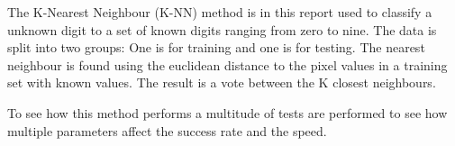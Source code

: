 

The K-Nearest Neighbour (K-NN) method is in this report used to classify a unknown digit to a set of known digits ranging from zero to nine.
The data is split into two groups: One is for training and one is for testing. 
The nearest neighbour is found using the euclidean distance to the pixel values in a training set with known values.
The result is a vote between the K closest neighbours.

To see how this method performs a multitude of tests are performed to see how multiple parameters affect the success rate and the speed.
